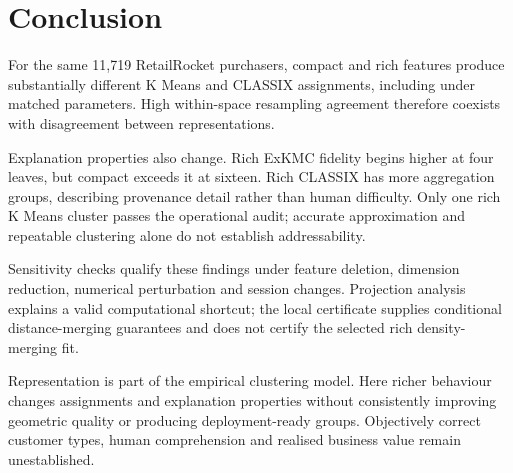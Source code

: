 \chapter{Conclusion}

For the same 11,719 RetailRocket purchasers, compact and rich features produce substantially different K Means and CLASSIX assignments, including under matched parameters. High within-space resampling agreement therefore coexists with disagreement between representations.

Explanation properties also change. Rich ExKMC fidelity begins higher at four leaves, but compact exceeds it at sixteen. Rich CLASSIX has more aggregation groups, describing provenance detail rather than human difficulty. Only one rich K Means cluster passes the operational audit; accurate approximation and repeatable clustering alone do not establish addressability.

Sensitivity checks qualify these findings under feature deletion, dimension reduction, numerical perturbation and session changes. Projection analysis explains a valid computational shortcut; the local certificate supplies conditional distance-merging guarantees and does not certify the selected rich density-merging fit.

Representation is part of the empirical clustering model. Here richer behaviour changes assignments and explanation properties without consistently improving geometric quality or producing deployment-ready groups. Objectively correct customer types, human comprehension and realised business value remain unestablished.
